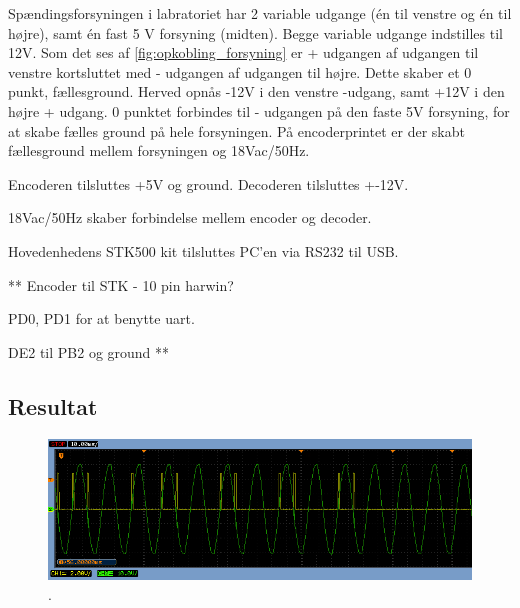 Spændingsforsyningen i labratoriet har 2 variable udgange (én til venstre og én til højre), samt én fast 5 V forsyning (midten). Begge variable udgange indstilles til 12V. 
Som det ses af \ref{fig:opkobling_forsyning} er + udgangen af udgangen til venstre kortsluttet med - udgangen af udgangen til højre. Dette skaber et 0 punkt, fællesground. Herved opnås -12V i den venstre -udgang, samt +12V i den højre + udgang. 0 punktet forbindes til - udgangen på den faste 5V forsyning, for at skabe fælles ground på hele forsyningen. På encoderprintet er der skabt fællesground mellem forsyningen og 18Vac/50Hz.

Encoderen tilsluttes +5V og ground.
Decoderen tilsluttes +-12V.

18Vac/50Hz skaber forbindelse mellem encoder og decoder.

Hovedenhedens STK500 kit tilsluttes PC'en via RS232 til USB.

** 
Encoder til STK - 10 pin harwin?

PD0, PD1 for at benytte uart.

DE2 til PB2 og ground
**

\subsection{Resultat}


\begin{figure}[htbp]
	\centering
	\includegraphics[width=\textwidth]{billeder/IntTest/Modtager_0101_ON}
	\caption{.}
	\label{fig:Modtager_0101_ON}
\end{figure}


